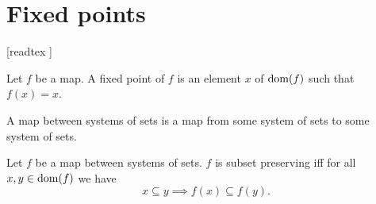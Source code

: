 \documentclass[../../set-theory/set-theory.tex]{subfiles}
\begin{document}
  \chapter{Fixed points}\label{fixed-points}


  \begin{forthel}

    [readtex ]

  \end{forthel}


  \begin{forthel}
    \begin{definition}
      Let $f$ be a map.
      A fixed point of $f$ is an element $x$ of $\operatorname{dom}(f)$ such that $f(x) = x$.
    \end{definition}
  \end{forthel}

  \begin{forthel}
    \begin{definition}
      A map between systems of sets is a map from some system of sets to some
      system of sets.
    \end{definition}
  \end{forthel}

  \begin{forthel}
    \begin{definition}
      Let $f$ be a map between systems of sets.
      $f$ is subset preserving iff for all $x, y \in \operatorname{dom}(f)$
      we have \[ x \subseteq y \implies f(x) \subseteq f(y). \]
    \end{definition}
  \end{forthel}
\end{document}
